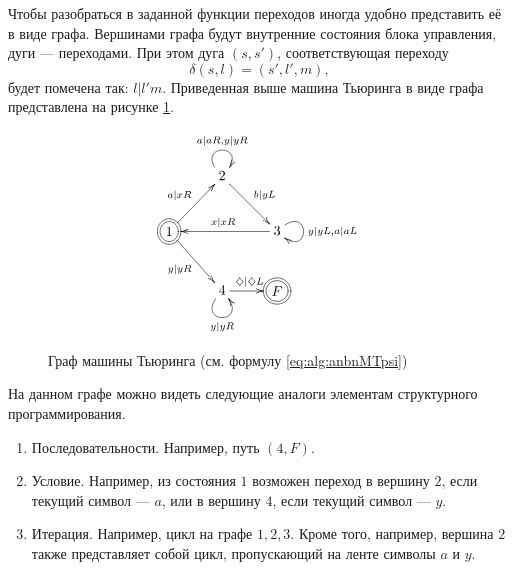 Чтобы разобраться в заданной функции переходов иногда удобно представить её в виде графа. Вершинами графа будут внутренние состояния блока управления, дуги --- переходами. При этом дуга $(s,s')$, соответствующая переходу
\[\delta(s,l)=(s',l',m),\] 
будет помечена так: $l|l'm$. Приведенная выше машина Тьюринга в виде графа представлена на рисунке \ref{fig:alg:anbnMTGraph}.
\begin{figure}
    \[
        {\xymatrix{
            *{}
                &2 \ar[dr]^{b|yL} \ar@(ul,ur)[]^{a|aR,y|yR}
                    &*{}
                        \\
            *++[o][F=]{1} \ar[ur]^{a|xR} \ar[dr]_{y|yR}
                &*{}
                    &3 \ar[ll]_{x|xR} \ar@(ur,dr)[]^{y|yL,a|aL}
                        \\
            *{}
                &4 \ar[r]^{\diamondsuit|\diamondsuit L} \ar@(dl,dr)[]_{y|yR}
                    &*++[o][F=]{F}
        }}
    \]
    \caption{Граф машины Тьюринга (см. формулу \ref{eq:alg:anbnMTpsi})}
    \label{fig:alg:anbnMTGraph}
\end{figure}
На данном графе можно видеть следующие аналоги элементам структурного программирования.
\begin{enumerate}
    \item Последовательности. Например, путь $(4,F)$.
    \item Условие. Например, из состояния $1$ возможен переход в вершину $2$, если текущий символ --- $a$, или в вершину $4$, если текущий символ --- $y$.
    \item Итерация. Например, цикл на графе $1,2,3$. Кроме того, например, вершина $2$ также представляет собой цикл, пропускающий на ленте символы $a$ и $y$.
\end{enumerate}

